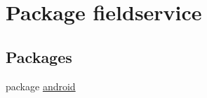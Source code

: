 \hypertarget{namespacefieldservice}{\section{Package fieldservice}
\label{namespacefieldservice}
}
\subsection*{Packages}
\begin{DoxyCompactItemize}
\item 
package \hyperlink{namespacefieldservice_1_1android}{android}
\end{DoxyCompactItemize}
